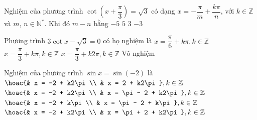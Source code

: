 \begin{ex}%
	Nghiệm của phương trình $\cot \left( x+\dfrac{\pi}{3} \right)=\sqrt{3}$ có dạng $x=-\dfrac{\pi}{m}+\dfrac{k\pi}{n}$, với $k\in \mathbb{Z}$ và $m$,  $n\in \mathbb{N^*}$. Khi đó $m-n$ bằng
	 \choice
		 {$-5$}
		{\True  $5$}
		 {$3$}
		{$-3$} 
\end{ex}

\begin{ex}%
	Phương  trình $3\cot x-\sqrt{3}=0$ có họ nghiệm là
	\choice 
		{$x=\dfrac{\pi}{6}+k\pi, k\in\mathbb{Z}$} 
		 {\True $x=\dfrac{\pi}{3}+k\pi, k\in\mathbb{Z}$}
		{$x=\dfrac{\pi}{3}+k2\pi, k\in\mathbb{Z}$} 
		{Vô nghiệm} 
\end{ex}

\begin{ex}%
	Nghiệm của phương trình $\sin  x = \sin(-2)$ là
	 \choice
		{$\hoac{& x =  -2 + k2\pi \\ & x = 2 + k2\pi}, k \in \mathbb{Z}$}
		{$\hoac{& x = -2 +  k2\pi \\ & x = \pi - 2 + k2\pi}, k \in \mathbb{Z}$}
		{$\hoac{& x = -2 + k\pi \\ & x = \pi - 2 + k\pi}, k \in \mathbb{Z}$} 
		{\True $\hoac{& x = -2 + k2\pi \\ & x  = \pi + 2 + k2\pi}, k \in \mathbb{Z}$}
\end{ex}

